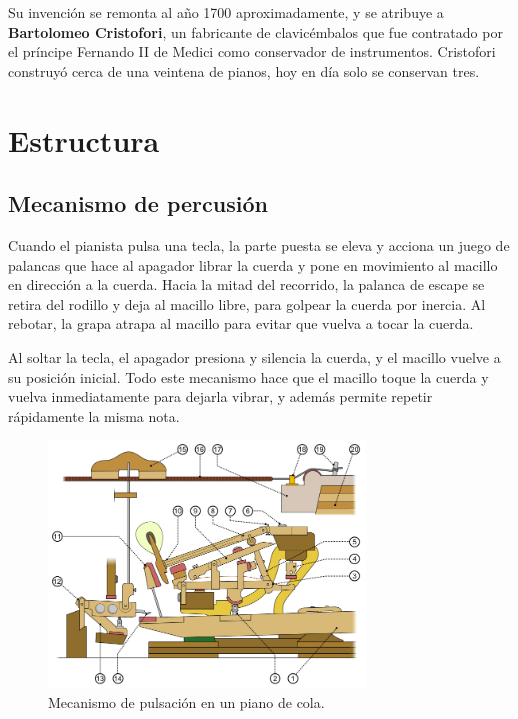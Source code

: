 \documentclass[10pt,a4paper]{article}
\begin{document}
	Su invención se remonta al año 1700 aproximadamente, y se atribuye a \textbf
	{Bartolomeo Cristofori}, un fabricante de clavicémbalos que fue  contratado 
	por el príncipe Fernando II de Medici como conservador de  instrumentos. 
	Cristofori construyó cerca de una veintena de pianos, hoy en día solo se 
	conservan tres.
	
	
	\clearpage
	\section{Estructura}
	
	\subsection{Mecanismo de percusión}
	
	Cuando el pianista pulsa una tecla, la parte puesta se eleva y acciona un 
	juego de palancas que hace al apagador librar la cuerda y pone en 
	movimiento al macillo en dirección a la cuerda. Hacia la mitad del 
	recorrido, la palanca de escape se retira del rodillo y deja al macillo 
	libre, para golpear la cuerda por inercia. Al rebotar, la grapa atrapa al 
	macillo para evitar que vuelva a tocar la cuerda.
	
	Al soltar la tecla, el apagador presiona y silencia la cuerda, y el macillo 
	vuelve a su posición inicial. Todo este mecanismo hace que el macillo 
	toque la cuerda y vuelva inmediatamente para dejarla vibrar, y además 
	permite repetir rápidamente la misma nota.
	
	\begin{figure}[!ht]
		\centering
		\includegraphics[width=0.75\textwidth]{images/pulsation}
		\caption[Mecanismo de pulsación]{\label{fig:pulsation} Mecanismo de pulsación en un piano de cola.}
	\end{figure}
	
\end{document}
